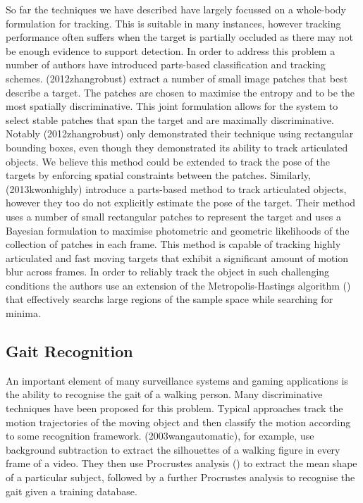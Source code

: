 So far the techniques we have described have largely focussed on a whole-body formulation for tracking. This is suitable in many instances, however tracking performance often suffers when the target is partially occluded as there may not be enough evidence to support detection. In order to address this problem a number of authors have introduced parts-based classification and tracking schemes. (2012zhangrobust) extract a number of small image patches that best describe a target. The patches are chosen to maximise the entropy and to be the most spatially discriminative. This joint formulation allows for the system to select stable patches that span the target and are maximally discriminative. Notably (2012zhangrobust) only demonstrated their technique using rectangular bounding boxes, even though they demonstrated its ability to track articulated objects. We believe this method could be extended to track the pose of the targets by enforcing spatial constraints between the patches.  Similarly, (2013kwonhighly) introduce a parts-based method to track articulated objects, however they too do not explicitly estimate the pose of the target. Their method uses a number of small rectangular patches to represent the target and uses a Bayesian formulation to maximise photometric and geometric likelihoods of the collection of patches in each frame. This method is capable of tracking highly articulated and fast moving targets that exhibit a significant amount of motion blur across frames. In order to reliably track the object in such challenging conditions the authors use an extension of the Metropolis-Hastings algorithm () that effectively searchs large regions of the sample space while searching for minima. 
 
\subsection{Gait Recognition}

An important element of many surveillance systems and gaming applications is the ability to recognise the gait of a walking person. Many discriminative techniques have been proposed for this problem. Typical approaches track the motion trajectories of the moving object and then classify the motion according to some recognition framework. (2003wangautomatic), for example, use background subtraction to extract the silhouettes of a walking figure in every frame of a video. They then use Procrustes analysis () to extract the mean shape of a particular subject, followed by a further Procrustes analysis to recognise the gait given a training database. 

